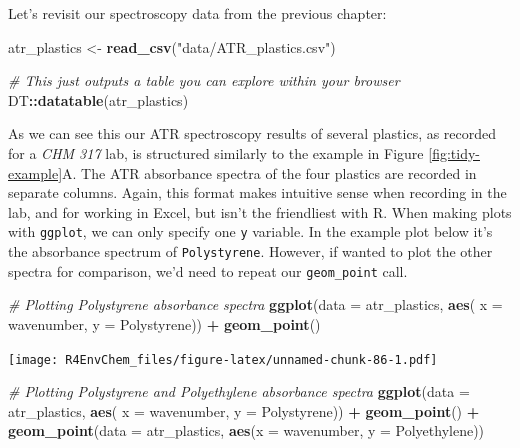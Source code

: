\documentclass[
]{book}
\newenvironment{Shaded}{\begin{snugshade}}{\end{snugshade}}
\newcommand{\AttributeTok}[1]{\textcolor[rgb]{0.13,0.29,0.53}{#1}}
\newcommand{\CommentTok}[1]{\textcolor[rgb]{0.56,0.35,0.01}{\textit{#1}}}
\newcommand{\FunctionTok}[1]{\textcolor[rgb]{0.13,0.29,0.53}{\textbf{#1}}}
\newcommand{\NormalTok}[1]{#1}
\newcommand{\OtherTok}[1]{\textcolor[rgb]{0.56,0.35,0.01}{#1}}
\newcommand{\SpecialCharTok}[1]{\textcolor[rgb]{0.81,0.36,0.00}{\textbf{#1}}}
\newcommand{\StringTok}[1]{\textcolor[rgb]{0.31,0.60,0.02}{#1}}
\begin{document}
Let's revisit our spectroscopy data from the previous chapter:

\begin{Shaded}
\begin{Highlighting}[]
\NormalTok{atr\_plastics }\OtherTok{\textless{}{-}} \FunctionTok{read\_csv}\NormalTok{(}\StringTok{"data/ATR\_plastics.csv"}\NormalTok{)}

\CommentTok{\# This just outputs a table you can explore within your browser}
\NormalTok{DT}\SpecialCharTok{::}\FunctionTok{datatable}\NormalTok{(atr\_plastics)}
\end{Highlighting}
\end{Shaded}

As we can see this our ATR spectroscopy results of several plastics, as recorded for a \emph{CHM 317} lab, is structured similarly to the example in Figure \ref{fig:tidy-example}A. The ATR absorbance spectra of the four plastics are recorded in separate columns. Again, this format makes intuitive sense when recording in the lab, and for working in Excel, but isn't the friendliest with R. When making plots with \texttt{ggplot}, we can only specify one \texttt{y} variable. In the example plot below it's the absorbance spectrum of \texttt{Polystyrene}. However, if wanted to plot the other spectra for comparison, we'd need to repeat our \texttt{geom\_point} call.

\begin{Shaded}
\begin{Highlighting}[]
\CommentTok{\# Plotting Polystyrene absorbance spectra}
\FunctionTok{ggplot}\NormalTok{(}\AttributeTok{data =}\NormalTok{ atr\_plastics, }
       \FunctionTok{aes}\NormalTok{( }\AttributeTok{x =}\NormalTok{ wavenumber,}
            \AttributeTok{y =}\NormalTok{ Polystyrene)) }\SpecialCharTok{+}
  \FunctionTok{geom\_point}\NormalTok{()}
\end{Highlighting}
\end{Shaded}

\texttt{[image: R4EnvChem\_files/figure-latex/unnamed-chunk-86-1.pdf]}

\begin{Shaded}
\begin{Highlighting}[]
\CommentTok{\# Plotting Polystyrene and Polyethylene absorbance spectra}
\FunctionTok{ggplot}\NormalTok{(}\AttributeTok{data =}\NormalTok{ atr\_plastics, }
       \FunctionTok{aes}\NormalTok{( }\AttributeTok{x =}\NormalTok{ wavenumber,}
            \AttributeTok{y =}\NormalTok{ Polystyrene)) }\SpecialCharTok{+}
  \FunctionTok{geom\_point}\NormalTok{() }\SpecialCharTok{+}
  \FunctionTok{geom\_point}\NormalTok{(}\AttributeTok{data =}\NormalTok{ atr\_plastics, }
             \FunctionTok{aes}\NormalTok{(}\AttributeTok{x =}\NormalTok{ wavenumber, }
                 \AttributeTok{y =}\NormalTok{ Polyethylene))}
\end{Highlighting}
\end{Shaded}
\end{document}
